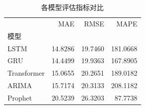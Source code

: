 \begin{table}[htbp]
\caption{各模型评估指标对比}
\label{tab:metrics}
\begin{tabular}{lrrr}
\toprule
 & MAE & RMSE & MAPE \\
模型 &  &  &  \\
\midrule
LSTM & 14.8286 & 19.7460 & 181.0668 \\
GRU & 14.4499 & 19.9363 & 167.8905 \\
Transformer & 15.0655 & 20.2651 & 189.0182 \\
ARIMA & 15.7174 & 20.3133 & 208.1182 \\
Prophet & 20.5239 & 26.3203 & 87.7738 \\
\bottomrule
\end{tabular}
\end{table}
